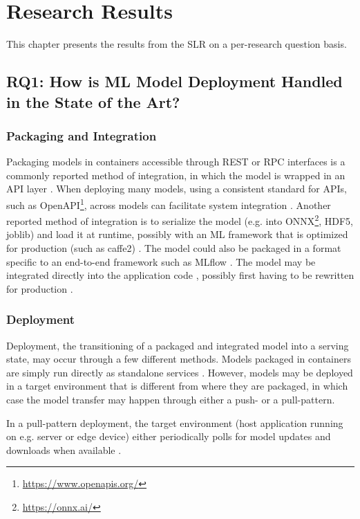 \chapter{Research Results}
This chapter presents the results from the SLR on a per-research question basis.

\section{RQ1: How is ML Model Deployment Handled in the State of the Art?}
\subsection{Packaging and Integration}
Packaging models in containers accessible through REST or RPC interfaces is a commonly reported method of integration, in which the model is wrapped in an API layer \cite{Garcia2020, Li2017, Ruf2021, Crankshaw2017}.
When deploying many models, using a consistent standard for APIs, such as OpenAPI\footnote{\url{https://www.openapis.org/}}, across models can facilitate system integration \cite{Garcia2020}.
Another reported method of integration is to serialize the model (e.g. into ONNX\footnote{\url{https://onnx.ai/}}, HDF5, joblib) and load it at runtime, possibly with an ML framework that is optimized for production (such as caffe2) \cite{Hazelwood2018, Peticolas2019, Paeaekkoenen2020, Chahal2020}.
The model could also be packaged in a format specific to an end-to-end framework such as MLflow \cite{Chen2020}.
The model may be integrated directly into the application code \cite{Liu2020, Ruf2021, Granlund2021}, possibly first having to be rewritten for production \cite{Hazelwood2018}.

\subsection{Deployment}
Deployment, the transitioning of a  packaged and integrated model into a serving state, may occur through a few different methods.
Models packaged in containers are simply run directly as standalone services \cite{Liu2020,Ruf2021, Granlund2021, Li2017, Garcia2020}.
However, models may be deployed in a target environment that is different from where they are packaged, in which case the model transfer may happen through either a push- or a pull-pattern.

In a pull-pattern deployment, the target environment (host application running on e.g. server or edge device) either periodically polls for model updates and downloads when available \cite{Paeaekkoenen2020, Li2017, Peticolas2019}.

